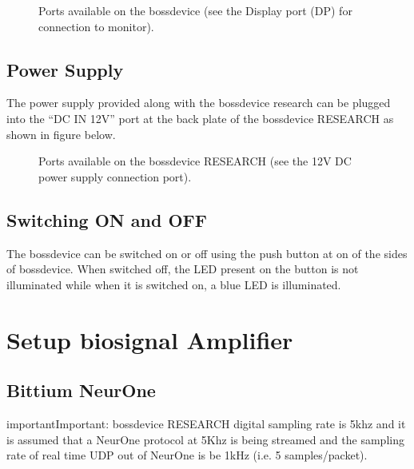 \documentclass[letterpaper,10pt,english]{sphinxmanual}
\begin{document}
\begin{figure}[htbp]
\centering
\capstart

\noindent{}
\caption{Ports available on the bossdevice (see the Display port (DP) for connection to monitor).}\label{\detokenize{2_setup_bossdevice_research:id6}}\end{figure}


\section{Power Supply}
\label{\detokenize{2_setup_bossdevice_research:power-supply}}
\sphinxAtStartPar
The power supply provided along with the bossdevice research can be plugged into the “DC IN 12V” port at the back plate of the bossdevice RESEARCH as shown in figure below.

\begin{figure}[htbp]
\centering
\capstart

\noindent{}
\caption{Ports available on the bossdevice RESEARCH (see the 12V DC power supply connection port).}\label{\detokenize{2_setup_bossdevice_research:id7}}\end{figure}


\section{Switching ON and OFF}
\label{\detokenize{2_setup_bossdevice_research:switching-on-and-off}}
\sphinxAtStartPar
The bossdevice can be switched on or off using the push button at on of the sides of bossdevice. When switched off, the LED present on the button is not illuminated while when it is switched on, a blue LED is illuminated.


\chapter{Setup biosignal Amplifier}
\label{\detokenize{3_setup_biosignal_amplifier:setup-biosignal-amplifier}}\label{\detokenize{3_setup_biosignal_amplifier::doc}}

\section{Bittium NeurOne}
\label{\detokenize{3_setup_biosignal_amplifier:bittium-neurone}}
\begin{sphinxadmonition}{important}{Important:}
\sphinxAtStartPar
bossdevice RESEARCH digital sampling rate is 5khz and it is assumed that a NeurOne protocol at 5Khz is being streamed and the sampling rate of real time UDP out of NeurOne is be 1kHz (i.e. 5 samples/packet).
\end{sphinxadmonition}
\end{document}
